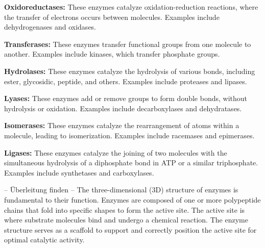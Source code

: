 \begin{compactenum}
    \item \textbf{Oxidoreductases:} These enzymes catalyze oxidation-reduction reactions, where the transfer of electrons occurs between molecules. Examples include dehydrogenases and oxidases.
    
    \item \textbf{Transferases:} These enzymes transfer functional groups from one molecule to another. Examples include kinases, which transfer phosphate groups.
    
    \item \textbf{Hydrolases:} These enzymes catalyze the hydrolysis of various bonds, including ester, glycosidic, peptide, and others. Examples include proteases and lipases.
    
    \item \textbf{Lyases:} These enzymes add or remove groups to form double bonds, without hydrolysis or oxidation. Examples include decarboxylases and dehydratases.
    
    \item \textbf{Isomerases:} These enzymes catalyze the rearrangement of atoms within a molecule, leading to isomerization. Examples include racemases and epimerases.
    
    \item \textbf{Ligases:} These enzymes catalyze the joining of two molecules with the simultaneous hydrolysis of a diphosphate bond in ATP or a similar triphosphate. Examples include synthetases and carboxylases.
    
\end{compactenum}

-- Überleitung finden --
The three-dimensional (3D) structure of enzymes is fundamental to their function. Enzymes are composed of one or more polypeptide chains that fold into specific shapes to form the active site. The active site is where substrate molecules bind and undergo a chemical reaction. The enzyme structure serves as a scaffold to support and correctly position the active site for optimal catalytic activity. 

